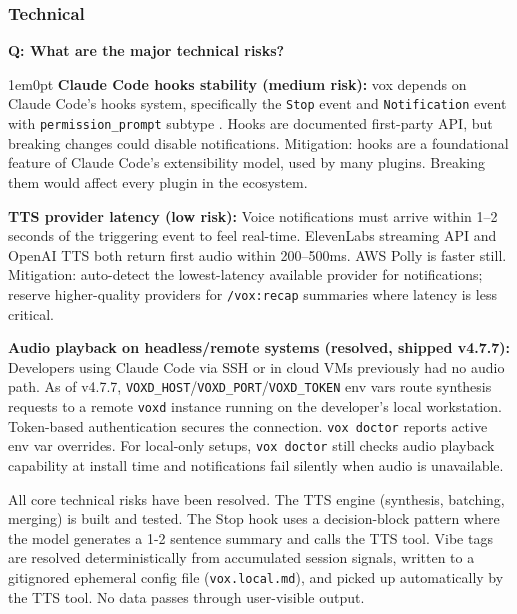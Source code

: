\documentclass[11pt,letterpaper]{article}
\newcounter{faqnum}
\newenvironment{faqpair}[1]{%
  \needspace{4\baselineskip}%
  \vspace{0.5em}%
  \refstepcounter{faqnum}%
  \noindent\textbf{\color{SectionBlue}Q\thefaqnum: #1}\par\nopagebreak[4]%
  \vspace{0.2em}%
  \begin{adjustwidth}{1em}{0pt}%
  \setlength{\parindent}{0pt}%
}{%
  \end{adjustwidth}%
  \vspace{0.5em}%
}
\begin{document}
\subsubsection*{Technical}

\begin{faqpair}{What are the major technical risks?}\label{faq:tech-risks}
  \textbf{Claude Code hooks stability (medium risk):} vox depends on
  Claude Code's hooks system, specifically the \texttt{Stop} event and
  \texttt{Notification} event with \texttt{permission\_prompt} subtype
  \cite{claudecodehooks2026}. Hooks are documented first-party API, but
  breaking changes could disable notifications. Mitigation: hooks are a
  foundational feature of Claude Code's extensibility model, used by many
  plugins. Breaking them would affect every plugin in the ecosystem.

  \textbf{TTS provider latency (low risk):} Voice notifications must arrive
  within 1--2 seconds of the triggering event to feel real-time. ElevenLabs
  streaming API and OpenAI TTS both return first audio within 200--500ms.
  AWS Polly is faster still. Mitigation: auto-detect the lowest-latency
  available provider for notifications; reserve higher-quality providers for
  \texttt{/vox:recap} summaries where latency is less critical.

  \textbf{Audio playback on headless/remote systems (resolved, shipped
  v4.7.7):} Developers using Claude Code via SSH or in cloud VMs previously
  had no audio path. As of v4.7.7, \texttt{VOXD\_HOST}/\allowbreak\texttt{VOXD\_PORT}/\allowbreak\texttt{VOXD\_TOKEN}
  env vars route synthesis requests to a remote \texttt{voxd} instance
  running on the developer's local workstation. Token-based authentication
  secures the connection. \texttt{vox doctor} reports active env var
  overrides. For local-only setups, \texttt{vox doctor} still checks audio
  playback capability at install time and notifications fail silently when
  audio is unavailable.

  All core technical risks have been resolved. The TTS engine (synthesis,
  batching, merging) is built and tested. The Stop hook uses a decision-block
  pattern where the model generates a 1-2 sentence summary and calls the TTS
  tool. Vibe tags are resolved deterministically from accumulated session
  signals, written to a gitignored ephemeral config file
  (\texttt{vox.local.md}), and picked up automatically by the TTS tool.
  No data passes through user-visible output.
\end{faqpair}
\end{document}
